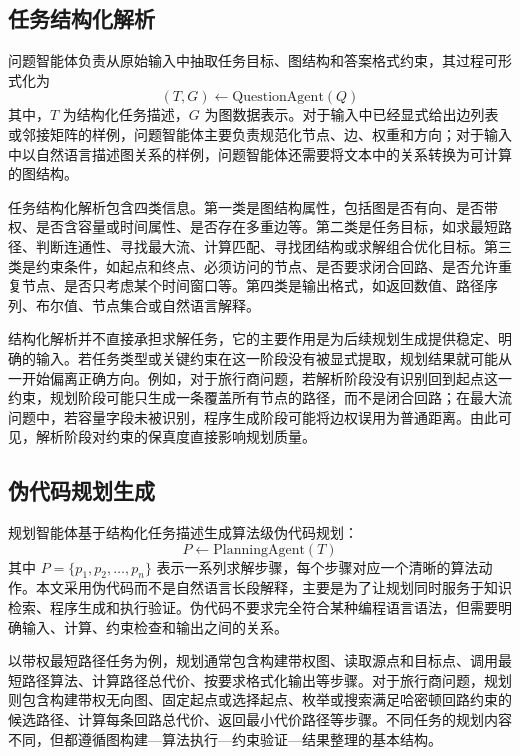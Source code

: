 \subsection{任务结构化解析}

问题智能体负责从原始输入中抽取任务目标、图结构和答案格式约束，其过程可形式化为
\begin{equation}
(T,G) \leftarrow \mathrm{QuestionAgent}(Q)
\end{equation}
其中，$T$ 为结构化任务描述，$G$ 为图数据表示。对于输入中已经显式给出边列表或邻接矩阵的样例，问题智能体主要负责规范化节点、边、权重和方向；对于输入中以自然语言描述图关系的样例，问题智能体还需要将文本中的关系转换为可计算的图结构。

任务结构化解析包含四类信息。第一类是图结构属性，包括图是否有向、是否带权、是否含容量或时间属性、是否存在多重边等。第二类是任务目标，如求最短路径、判断连通性、寻找最大流、计算匹配、寻找团结构或求解组合优化目标。第三类是约束条件，如起点和终点、必须访问的节点、是否要求闭合回路、是否允许重复节点、是否只考虑某个时间窗口等。第四类是输出格式，如返回数值、路径序列、布尔值、节点集合或自然语言解释。

结构化解析并不直接承担求解任务，它的主要作用是为后续规划生成提供稳定、明确的输入。若任务类型或关键约束在这一阶段没有被显式提取，规划结果就可能从一开始偏离正确方向。例如，对于旅行商问题，若解析阶段没有识别回到起点这一约束，规划阶段可能只生成一条覆盖所有节点的路径，而不是闭合回路；在最大流问题中，若容量字段未被识别，程序生成阶段可能将边权误用为普通距离。由此可见，解析阶段对约束的保真度直接影响规划质量。

\subsection{伪代码规划生成}

规划智能体基于结构化任务描述生成算法级伪代码规划：
\begin{equation}
P \leftarrow \mathrm{PlanningAgent}(T)
\end{equation}
其中 $P=\{p_1,p_2,\ldots,p_n\}$ 表示一系列求解步骤，每个步骤对应一个清晰的算法动作。本文采用伪代码而不是自然语言长段解释，主要是为了让规划同时服务于知识检索、程序生成和执行验证。伪代码不要求完全符合某种编程语言语法，但需要明确输入、计算、约束检查和输出之间的关系。

以带权最短路径任务为例，规划通常包含构建带权图、读取源点和目标点、调用最短路径算法、计算路径总代价、按要求格式化输出等步骤。对于旅行商问题，规划则包含构建带权无向图、固定起点或选择起点、枚举或搜索满足哈密顿回路约束的候选路径、计算每条回路总代价、返回最小代价路径等步骤。不同任务的规划内容不同，但都遵循图构建—算法执行—约束验证—结果整理的基本结构。

